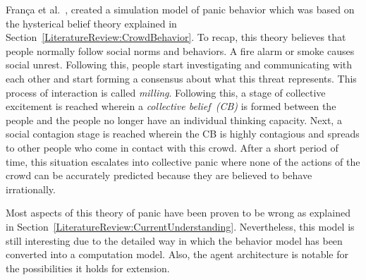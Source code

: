 Fran{\c c}a et al.~\cite{Franca:2009wq}, created a simulation model of panic behavior which was based on the hysterical belief theory explained in Section~\ref{LiteratureReview:CrowdBehavior}. To recap, this theory believes that people normally follow social norms and behaviors. A fire alarm or smoke causes social unrest. Following this, people start investigating and communicating with each other and start forming a consensus about what this threat represents. This process of interaction is called \emph{milling}. Following this, a stage of collective excitement is reached wherein a \emph{collective belief~(CB)} is formed between the people and the people no longer have an individual thinking capacity. Next, a social contagion stage is reached wherein the CB is highly contagious and spreads to other people who come in contact with this crowd. After a short period of time, this situation escalates into collective panic where none of the actions of the crowd can be accurately predicted because they are believed to behave irrationally.

Most aspects of this theory of panic have been proven to be wrong as explained in Section~\ref{LiteratureReview:CurrentUnderstanding}. Nevertheless, this model is still interesting due to the detailed way in which the behavior model has been converted into a computation model. Also, the agent architecture is notable for the possibilities it holds for extension.

